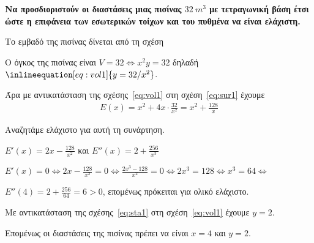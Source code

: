 \begin{mybox3}
\begin{exercise}
  {\bfseries \boldmath Να προσδιοριστούν οι διαστάσεις μιας πισίνας 
    $ \SI{32}{m^3} $ με τετραγωνική βάση έτσι ώστε η επιφάνεια των εσωτερικών 
  τοίχων και του πυθμένα να είναι ελάχιστη.}
\end{exercise}
\end{mybox3}
\begin{solution}
\item {}

  Το εμβαδό της πισίνας δίνεται από τη σχέση

  Ο όγκος της πισίνας είναι $V = 32 \Leftrightarrow  x^{2}y = 32$
  δηλαδή $\inlineequation[eq:vol1]{y = {32}/{x^{2}}}$.

  Άρα με αντικατάσταση της σχέσης~\eqref{eq:vol1} στη
  σχέση~\eqref{eq:sur1} έχουμε
  \begin{align*}
    E(x) = x^{2} + 4x\cdot \frac{32}{x^{2}} = x^{2} + \frac{128}{x}
  \end{align*}

  Αναζητάμε ελάχιστο για αυτή τη συνάρτηση.
  \begin{myitemize}
    \item $ E'(x) = 2x - \frac{128}{x^{2}} $ και $ E''(x) = 2 + \frac{256}{x^{3}} $
    \item $ E'(x) = 0 \Leftrightarrow 2x - \frac{128}{x^{2}} = 0
      \Leftrightarrow \frac{2x^{3} - 128}{x^{2}} = 0 \Leftrightarrow
      2x^{3} = 128 \Leftrightarrow x^{3} = 64 \Leftrightarrow$
    \item $ E''(4) = 2 + \frac{256}{64} = 6 > 0 $, επομένως πρόκειται για
      ολικό ελάχιστο.
  \end{myitemize}
  Με αντικατάσταση της σχέσης~\eqref{eq:sta1} στη σχέση~\eqref{eq:vol1} έχουμε 
  $ y = 2 $.

  Επομένως οι διαστάσεις της πισίνας πρέπει να είναι $ x = 4 $ και $ y = 2 $.
\end{solution}
